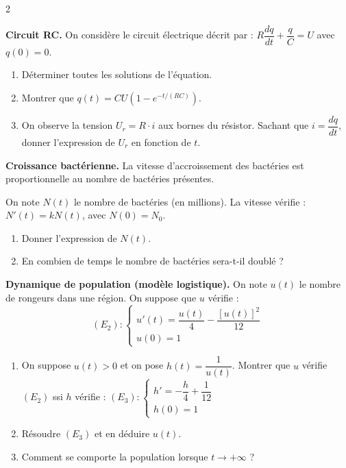 \begin{multicols*}{2}

\begin{Exercice}
\textbf{Circuit RC.}
On consid\`ere le circuit \'electrique d\'ecrit par :
$R\dfrac{dq}{dt}+\dfrac{q}{C}=U$ avec $q(0)=0$.
\begin{enumerate}
  \item D\'eterminer toutes les solutions de l'\'equation.
  \item Montrer que $q(t)=CU\!\left(1-e^{-t/(RC)}\right)$.
  \item On observe la tension $U_r=R\cdot i$ aux bornes du r\'esistor.
        Sachant que $i=\dfrac{dq}{dt}$, donner l'expression de $U_r$ en fonction de $t$.
\end{enumerate}
\end{Exercice}

\begin{Exercice}
\textbf{Croissance bact\'erienne.}
La vitesse d'accroissement des bact\'eries est proportionnelle
au nombre de bact\'eries pr\'esentes.

On note $N(t)$ le nombre de bact\'eries (en millions). La vitesse v\'erifie :
$N'(t)=kN(t)$, avec $N(0)=N_0$.
\begin{enumerate}
  \item Donner l'expression de $N(t)$.
  \item En combien de temps le nombre de bact\'eries sera-t-il doubl\'e ?
\end{enumerate}
\end{Exercice}

\begin{Exercice}
\textbf{Dynamique de population (mod\`ele logistique).}
On note $u(t)$ le nombre de rongeurs dans une r\'egion. On suppose que $u$ v\'erifie :
\[
  (E_2):\begin{cases}u'(t)=\dfrac{u(t)}{4}-\dfrac{[u(t)]^2}{12}\\u(0)=1\end{cases}
\]
\begin{enumerate}[label=\alph*)]
  \item On suppose $u(t)>0$ et on pose $h(t)=\dfrac{1}{u(t)}$.
        Montrer que $u$ v\'erifie $(E_2)$ ssi $h$ v\'erifie :
        $(E_3):\begin{cases}h'=-\dfrac{h}{4}+\dfrac{1}{12}\\h(0)=1\end{cases}$
  \item R\'esoudre $(E_3)$ et en d\'eduire $u(t)$.
  \item Comment se comporte la population lorsque $t\to+\infty$ ?
\end{enumerate}
\end{Exercice}


\end{multicols*}
